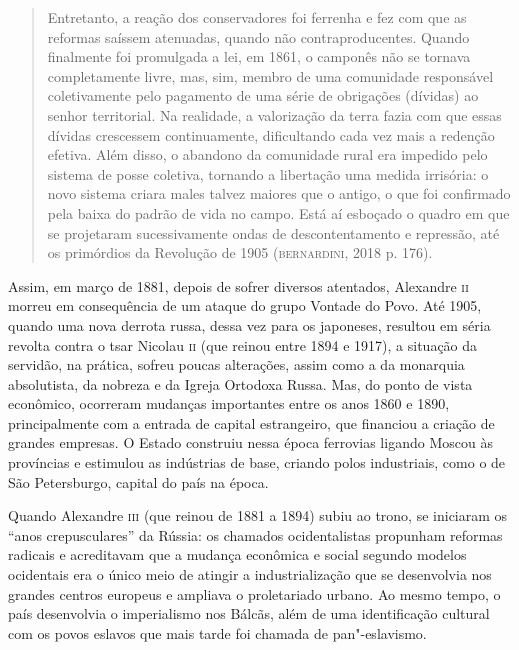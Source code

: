 \documentclass[11pt]{extarticle}
\begin{document}
\begin{quote}
Entretanto, a reação dos conservadores foi ferrenha e fez com que as
reformas saíssem atenuadas, quando não contraproducentes. Quando
finalmente foi promulgada a lei, em 1861, o camponês não se tornava
completamente livre, mas, sim, membro de uma comunidade responsável
coletivamente pelo pagamento de uma série de obrigações (dívidas) ao
senhor territorial. Na realidade, a valorização da terra fazia com que
essas dívidas crescessem continuamente, dificultando cada vez mais a
redenção efetiva. Além disso, o abandono da comunidade rural era
impedido pelo sistema de posse coletiva, tornando a libertação uma
medida irrisória: o novo sistema criara males talvez maiores que o
antigo, o que foi confirmado pela baixa do padrão de vida no campo. Está
aí esboçado o quadro em que se projetaram sucessivamente ondas de
descontentamento e repressão, até os primórdios da Revolução de 1905
(\textsc{bernardini}, 2018 p. 176).
\end{quote}



Assim, em março de 1881, depois de sofrer diversos atentados, Alexandre
\textsc{ii} morreu em consequência de um ataque do grupo Vontade do Povo. Até
1905, quando uma nova derrota russa, dessa vez para os japoneses,
resultou em séria revolta contra o tsar Nicolau \textsc{ii} (que reinou entre
1894 e 1917), a situação da servidão, na prática, sofreu poucas
alterações, assim como a da monarquia absolutista, da nobreza e da
Igreja Ortodoxa Russa. Mas, do ponto de vista econômico, ocorreram
mudanças importantes entre os anos 1860 e 1890, principalmente com a
entrada de capital estrangeiro, que financiou a criação de grandes
empresas. O Estado construiu nessa época ferrovias ligando Moscou às
províncias e estimulou as indústrias de base, criando polos industriais,
como o de São Petersburgo, capital do país na época.


Quando Alexandre \textsc{iii} (que reinou de 1881 a 1894) subiu ao trono, se
iniciaram os ``anos crepusculares'' da Rússia: os chamados
ocidentalistas propunham reformas radicais e acreditavam que a mudança
econômica e social segundo modelos ocidentais era o único meio de
atingir a industrialização que se desenvolvia nos grandes centros
europeus e ampliava o proletariado urbano. Ao mesmo tempo, o país
desenvolvia o imperialismo nos Bálcãs, além de uma identificação
cultural com os povos eslavos que mais tarde foi chamada de
pan"-eslavismo.
\end{document}
